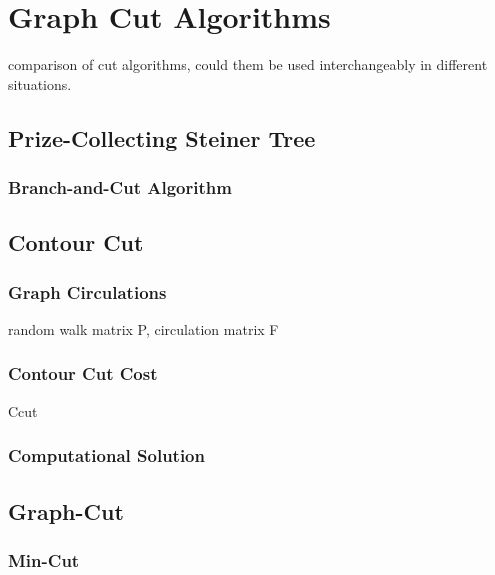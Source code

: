 \documentclass{SMBV12}
\begin{document}
\section{Graph Cut Algorithms}

comparison of cut algorithms, could them be used interchangeably in different situations.

\subsection{Prize-Collecting Steiner Tree}
\label{sec:branch_and_cut}
\cite{ljubic2006algorithmic}

\subsubsection{Branch-and-Cut Algorithm}

\subsection{Contour Cut}

\subsubsection{Graph Circulations}
\label{sec:normalized_cut}

\cite{shi2000normalized}

random walk matrix P, circulation matrix F

\subsubsection{Contour Cut Cost}

Ccut

\cite{zhu2007untangling}
\cite{KenGalShi2011}

\subsubsection{Computational Solution}

\subsection{Graph-Cut}

\subsubsection{Min-Cut}
\end{document}
